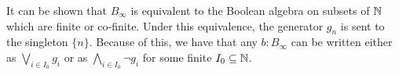 \begin{remark}\label{BinftyTermsWriting}
  It can be shown that $B_\infty$ is equivalent to the Boolean algebra on 
  subsets of $\mathbb{N}$ which are finite or co-finite. 
  Under this equivalence, the generator $g_n$ is sent to the singleton $\{n\}$. 
  Because of this, we have that any $b:B_\infty$ can be written 
  either as $\bigvee_{i\in I_0} g_i$ or as $\bigwedge_{i\in I_0} \neg g_i$ for some finite $I_0\subseteq \mathbb{N}$. 
\end{remark}






